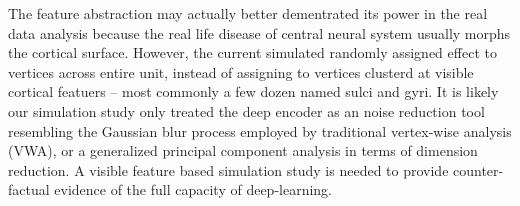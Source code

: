 The feature abstraction may actually better dementrated its power in the real data analysis because the real life disease of central neural system usually morphs the cortical surface. However, the current simulated randomly assigned effect to vertices across entire unit, instead of assigning to vertices clusterd at visible cortical featuers -- most commonly a few dozen named sulci and gyri. It is likely our simulation study only treated the deep encoder as an noise reduction tool resembling the Gaussian blur process employed by traditional vertex-wise analysis (VWA), or a generalized principal component analysis in terms of dimension reduction. A visible feature based simulation study is needed to provide counter-factual evidence of the full capacity of deep-learning.
